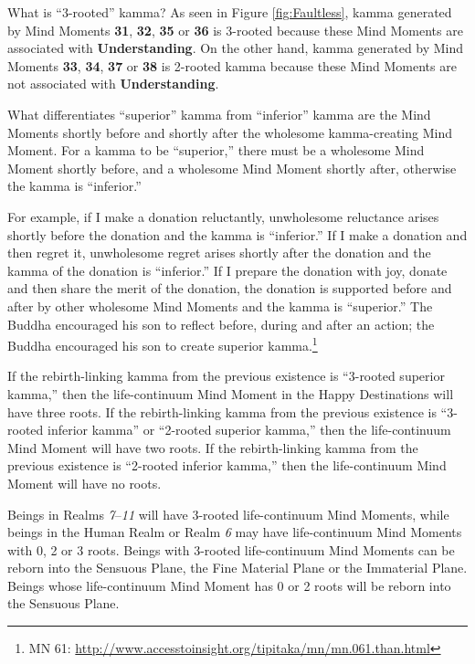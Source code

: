 What is “3-rooted” kamma? As seen in Figure \ref{fig:Faultless}, kamma generated by Mind Moments \textbf{31}, \textbf{32}, \textbf{35} or \textbf{36} is 3-rooted because these Mind Moments are associated with \textbf{Understanding}. On the other hand, kamma generated by Mind Moments \textbf{33}, \textbf{34}, \textbf{37} or \textbf{38} is 2-rooted kamma because these Mind Moments are not associated with \textbf{Understanding}.

What differentiates “superior” kamma from “inferior” kamma are the Mind Moments shortly before and shortly after the wholesome kamma-creating Mind Moment. For a kamma to be “superior,” there must be a wholesome Mind Moment shortly before, and a wholesome Mind Moment shortly after, otherwise the kamma is “inferior.” 

\pagebreak

For example, if I make a donation reluctantly, unwholesome reluctance arises shortly before the donation and the kamma is “inferior.” If I make a donation and then regret it, unwholesome regret arises shortly after the donation and the kamma of the donation is “inferior.” If I prepare the donation with joy, donate and then share the merit of the donation, the donation is supported before and after by other wholesome Mind Moments and the kamma is “superior.” The Buddha encouraged his son to reflect before, during and after an action; the Buddha encouraged his son to create superior kamma.\footnote{MN 61: \url{http://www.accesstoinsight.org/tipitaka/mn/mn.061.than.html}}

If the rebirth-linking kamma from the previous existence is “3-rooted superior kamma,” then the life-continuum Mind Moment in the Happy Destinations will have three roots. If the rebirth-linking kamma from the previous existence is “3-rooted inferior kamma” or “2-rooted superior kamma,” then the life-continuum Mind Moment will have two roots. If the rebirth-linking kamma from the previous existence is “2-rooted inferior kamma,” then the life-continuum Mind Moment will have no roots.

Beings in Realms \textit{7}--\textit{11} will have 3-rooted life-continuum Mind Moments, while beings in the Human Realm or Realm \textit{6} may have life-continuum Mind Moments with 0, 2 or 3 roots. Beings with 3-rooted life-continuum Mind Moments can be reborn into the Sensuous Plane, the Fine Material Plane or the Immaterial Plane. Beings whose life-continuum Mind Moment has 0 or 2 roots will be reborn into the Sensuous Plane.

